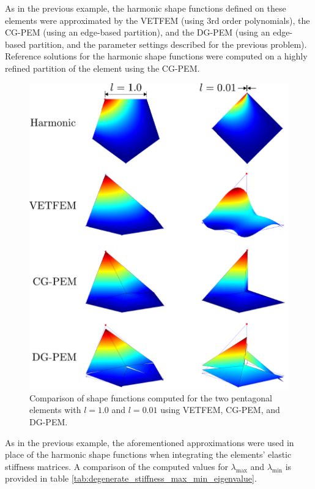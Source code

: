 As in the previous example, the harmonic shape functions defined on these elements were approximated by the VETFEM (using 3rd order polynomials), the CG-PEM (using an edge-based partition), and the DG-PEM (using an edge-based partition, and the parameter settings described for the previous problem). Reference solutions for the harmonic shape functions were computed on a highly refined partition of the element using the CG-PEM.

\begin{figure}[!h]
  \centering
  \includegraphics[width=5.0in]{figures/degenerate_element_comparison.pdf}  \caption{Comparison of shape functions computed for the two pentagonal elements with $l=1.0$ and $l=0.01$ using VETFEM, CG-PEM, and DG-PEM.}
  \label{fig:degenerate_element_comparison}
\end{figure}

As in the previous example, the aforementioned approximations were used in place of the harmonic shape functions when integrating the elements' elastic stiffness matrices. A comparison of the computed values for $\lambda_{\max}$ and $\lambda_{\min}$ is provided in table \ref{tab:degenerate_stiffness_max_min_eigenvalue}.

